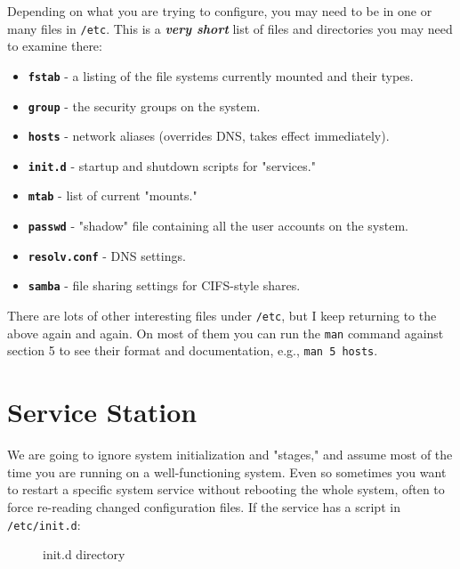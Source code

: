 \documentclass[10pt,]{book}
\numberwithin{figure}{chapter}
\DeclareRobustCommand{\drcap}[1]{\begin{figure}[H]\caption{#1}\end{figure}}
\begin{document}
Depending on what you are trying to configure, you may need to be in one
or many files in \texttt{/etc}. This is a \textbf{\emph{very short}}
list of files and directories you may need to examine there:

\begin{itemize}
\item
  \textbf{\texttt{fstab}} - a listing of the file systems
  currently mounted and their types.
\item
  \textbf{\texttt{group}} - the security groups on the
  system.
\item
  \textbf{\texttt{hosts}} - network aliases (overrides DNS,
  takes effect immediately).
\item
  \textbf{\texttt{init.d}} - startup and shutdown scripts
  for "services."
\item
  \textbf{\texttt{mtab}} - list of current "mounts."
\item
  \textbf{\texttt{passwd}} - "shadow" file containing all
  the user accounts on the system.
\item
  \textbf{\texttt{resolv.conf}} - DNS settings.
\item
  \textbf{\texttt{samba}} - file sharing settings for
  CIFS-style shares.
\end{itemize}

There are lots of other interesting files under \texttt{/etc}, but I
keep returning to the above again and again. On most of them you can run
the \texttt{man} command against section 5 to see their format and
documentation, e.g., \texttt{man 5 hosts}.

\section*{Service Station}\label{service-station}

We are going to ignore system initialization and "stages," and assume
most of the time you are running on a well-functioning system. Even so
sometimes you want to restart a specific system service without
rebooting the whole system, often to force re-reading changed
configuration files. If the service has a script in
\texttt{/etc/init.d}:

\drcap{init.d directory}
\end{document}
